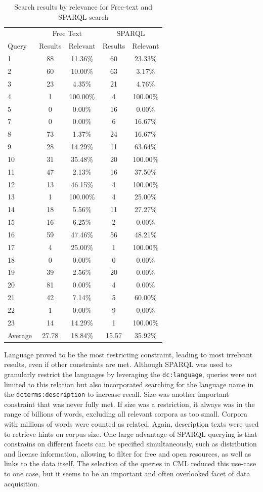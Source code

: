 \documentclass[smallextended]{svjour3}       %
\begin{document}
\begin{table}
    \begin{tabular}{lcccc}
        \toprule
        & \multicolumn{2}{c}{Free Text} & \multicolumn{2}{c}{SPARQL} \\
        Query & Results &
        Relevant &
        Results
        & Relevant \\
        \midrule
1&88&11.36\%&60&23.33\%\\
2&60&10.00\%&63&3.17\%\\
3&23&4.35\%&21&4.76\%\\
4&1&100.00\%&4&100.00\%\\
5&0&0.00\%&16&0.00\%\\
7&0&0.00\%&6&16.67\%\\
8&73&1.37\%&24&16.67\%\\
9&28&14.29\%&11&63.64\%\\
10&31&35.48\%&20&100.00\%\\
11&47&2.13\%&16&37.50\%\\
12&13&46.15\%&4&100.00\%\\
13&1&100.00\%&4&25.00\%\\
14&18&5.56\%&11&27.27\%\\
15&16&6.25\%&2&0.00\%\\
16&59&47.46\%&56&48.21\%\\
17&4&25.00\%&1&100.00\%\\
18&0&0.00\%&0&0.00\%\\
19&39&2.56\%&20&0.00\%\\
20&81&0.00\%&4&0.00\%\\
21&42&7.14\%&5&60.00\%\\
22&1&0.00\%&9&0.00\%\\
23&14&14.29\%&1&100.00\%\\
        \midrule
Average&27.78&18.84\%&15.57&35.92\%\\
        \bottomrule
    \end{tabular}
    \caption{\label{tab:rel}Search results by relevance for Free-text and SPARQL
    search}
\end{table}


Language proved to be the most restricting constraint, leading to most irrelvant
results, even if other constraints are met. Although SPARQL was used to
granularly restrict the languages by leveraging the \texttt{dc:language},
queries were not limited to this relation but also incorporated searching for
the language name in the \texttt{dcterms:description} to increase recall.  Size
was another important constraint that was never fully met. If size was a
restriction, it always was in the range of billions of words, excluding all
relevant corpora as too small. Corpora with millions of words were counted as
related. Again, description texts were used to retrieve
hints on corpus size.  One large advantage of SPARQL querying is that constrains
on different facets can be specified simultaneously, such as 
distribution and license information, allowing to filter for free and open
resources, as well as links to the data itself. The selection of the queries in
CML reduced this use-case to one case, but it seems to be an important and often
overlooked facet of data acquisition.
\end{document}
